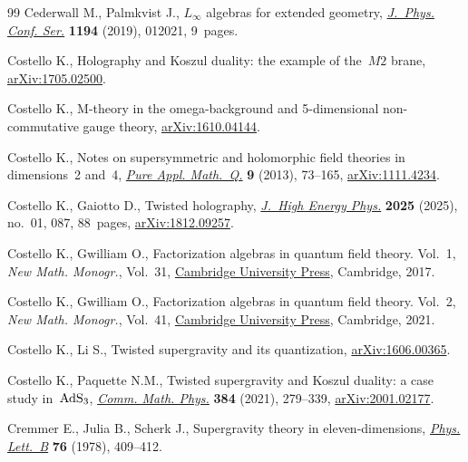 \begin{thebibliography}{99}
Cederwall M., Palmkvist J., {$L_\infty$} algebras for extended geometry,
 \href{https://doi.org/10.1088/1742-6596/1194/1/012021}{\textit{J.~Phys. Conf.
 Ser.}} \textbf{1194} (2019), 012021, 9~pages.

Costello K., Holography and Koszul duality: the example of the~$M2$ brane,
 \href{http://arxiv.org/abs/1705.02500}{arXiv:1705.02500}.

Costello K., M-theory in the omega-background and 5-dimensional non-commutative
 gauge theory, \href{http://arxiv.org/abs/1610.04144}{arXiv:1610.04144}.

Costello K., Notes on supersymmetric and holomorphic field theories in
 dimensions~2 and~4,
 \href{https://doi.org/10.4310/PAMQ.2013.v9.n1.a3}{\textit{Pure Appl.
 Math.~Q.}} \textbf{9} (2013), 73--165,
 \href{http://arxiv.org/abs/1111.4234}{arXiv:1111.4234}.

Costello K., Gaiotto D., Twisted holography,
 \href{https://doi.org/10.1007/JHEP01(2025)087}{\textit{J.~High Energy Phys.}}
 \textbf{2025} (2025), no.~01, 087, 88~pages,
 \href{http://arxiv.org/abs/1812.09257}{arXiv:1812.09257}.

Costello K., Gwilliam O., Factorization algebras in quantum field theory.
 {V}ol.~1, \textit{New Math. Monogr.}, Vol.~31,
 \href{https://doi.org/10.1017/9781316678626}{Cambridge University Press},
 Cambridge, 2017.

Costello K., Gwilliam O., Factorization algebras in quantum field theory.
 {V}ol.~2, \textit{New Math. Monogr.}, Vol.~41,
 \href{https://doi.org/10.1017/9781316678664}{Cambridge University Press},
 Cambridge, 2021.

Costello K., Li S., Twisted supergravity and its quantization,
 \href{http://arxiv.org/abs/1606.00365}{arXiv:1606.00365}.

Costello K., Paquette N.M., Twisted supergravity and {K}oszul duality: a case
 study in~{$\rm AdS_3$},
 \href{https://doi.org/10.1007/s00220-021-04065-3}{\textit{Comm. Math. Phys.}}
 \textbf{384} (2021), 279--339,
 \href{http://arxiv.org/abs/2001.02177}{arXiv:2001.02177}.

Cremmer E., Julia B., Scherk J., Supergravity theory in eleven-dimensions,
 \href{https://doi.org/10.1016/0370-2693(78)90894-8}{\textit{Phys. Lett.~B}}
 \textbf{76} (1978), 409--412.


\end{thebibliography}
